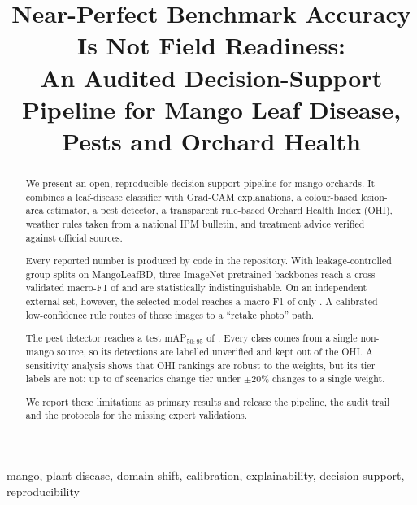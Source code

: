 \documentclass[conference]{IEEEtran}
\begin{document}
\title{Near-Perfect Benchmark Accuracy Is Not Field Readiness:\\
An Audited Decision-Support Pipeline for Mango Leaf Disease, Pests and Orchard Health}

\author{
\IEEEauthorblockA{[Affiliation]}}

\maketitle

\begin{abstract}
We present an open, reproducible decision-support pipeline for mango orchards. It combines a leaf-disease
classifier with Grad-CAM explanations, a colour-based lesion-area estimator, a pest detector, a transparent
rule-based Orchard Health Index (OHI), weather rules taken from a national IPM bulletin, and treatment advice
verified against official sources.

Every reported number is produced by code in the repository. With leakage-controlled group splits on MangoLeafBD,
three ImageNet-pretrained backbones reach a cross-validated macro-F1 of \cvMacroFOne{} and are statistically
indistinguishable. On an independent external set, however, the selected model reaches a macro-F1 of only
\extMacroFOne{} \extMacroFOneCI{}. A calibrated low-confidence rule routes \extFlagged{} of those images to a
``retake photo'' path.

The pest detector reaches a test mAP$_{50:95}$ of \pestTestMap{}. Every class comes from a single non-mango source,
so its detections are labelled unverified and kept out of the OHI. A sensitivity analysis shows that OHI rankings
are robust to the weights, but its tier labels are not: up to \ohiMaxTierChange{} of scenarios change tier under
$\pm$20\% changes to a single weight.

We report these limitations as primary results and release the pipeline, the audit trail and the protocols for
the missing expert validations.
\end{abstract}

\begin{IEEEkeywords}
mango, plant disease, domain shift, calibration, explainability, decision support, reproducibility
\end{IEEEkeywords}
\end{document}

